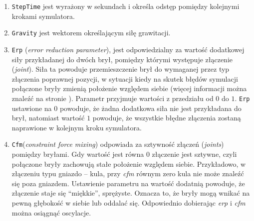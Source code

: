 	\begin {enumerate}
	 \item \texttt{StepTime} jest wyrażony w sekundach i określa odstęp pomiędzy kolejnymi krokami symulatora.
	 \item \texttt{Gravity} jest wektorem określającym siłę grawitacji.
	 \item \texttt{Erp} (\textit{error reduction parameter}), jest odpowiedzialny za wartość dodatkowej siły przykładanej do dwóch brył, pomiędzy którymi występuje złączenie (\textit{joint}).
	  Siła ta powoduje przemieszczenie brył do wymaganej przez typ złączenia poprawnej pozycji, w sytuacji kiedy na skutek błędów symulacji połączone bryły zmienią położenie względem siebie (więcej informacji można znaleźć na stronie \pageref{subsubsec:joints}).
	  Parametr przyjmuje wartości z przedziału od $0$ do $1$. \texttt{Erp} ustawione na $0$ powoduje, że żadna dodatkowa siła nie jest przykładana do brył, natomiast wartość $1$
	  powoduje, że wszystkie błędne złączenia zostaną naprawione w kolejnym kroku symulatora.
	 \item \texttt{Cfm}(\textit{constraint force mixing})  odpowiada za sztywność złączeń (\textit{joints}) pomiędzy bryłami. Gdy wartość jest równa $0$ złączenie jest sztywne, czyli połączone bryły
	  zachowują stałe położenie względem siebie.
	  Przykładowo, w złączeniu typu gniazdo -- kula, przy  \textit{cfm} równym zero kula nie może znaleźć się poza gniazdem.
	  Ustawienie parametru na wartość dodatnią powoduje, że złączenie staje się ``miękkie'', sprężyste. Oznacza to, że bryły mogą wnikać na pewną głębokość w siebie lub oddalać się.
	  Odpowiednio dobierając \textit{erp} i \textit{cfm} można osiągnąć oscylacje.
	  

\end{enumerate}
